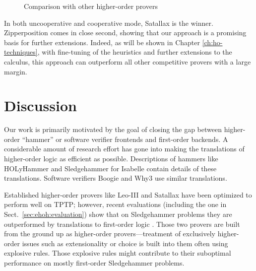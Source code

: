 \begin{figure}[t]
  \label{fig:higher-order-provers}
  \begin{center}
    \def\arraystretch{1.1}%
    \caption{Comparison with other higher-order provers}
  \end{center}
\end{figure}

In both uncooperative and cooperative mode, Satallax is the winner. Zipperposition comes
in close second, showing that our approach is a promising basis for further
extensions. Indeed, as will be shown in Chapter \ref{ch:ho-techniques}, with
fine-tuning of the heuristics and further extensions to the calculus, this
approach can outperform all other competitive provers with a large margin.

\section{Discussion}
\label{sect:bool:discussion}

Our work is primarily motivated by the goal of closing the gap between
higher-order ``hammer'' or software verifier frontends and first-order backends.
A considerable amount of research effort has gone into making the translations of
higher-order logic as efficient as possible. Descriptions of hammers like
HOLyHammer \cite{ku-15-holyhammer} and Sledgehammer
\cite{pb-12-sh} for Isabelle contain details of these
translations. Software verifiers Boogie \cite{lr-10-boogie} and Why3
\cite{bfcp-11-why3} use similar translations.

Established higher-order provers like Leo-III and Satallax
have been optimized to perform well on TPTP; however, recent evaluations (including the one in Sect.~\ref{sec:ehoh:evaluation}) show that on Sledgehammer
problems they are outperformed by translations to first-order logic
\cite{bbtvw-21-sup-lam, %
cbetal-11-cvc4}. Those two provers are built from the ground up as
higher-order provers---treatment of exclusively higher-order issues such as
extensionality or choice is built into them often using explosive rules. Those
explosive rules might contribute to their suboptimal performance on mostly
first-order Sledgehammer problems.

